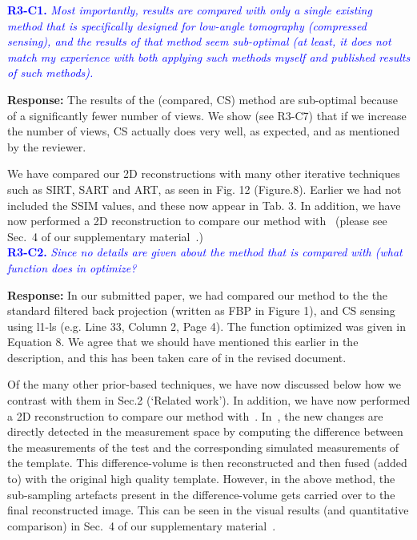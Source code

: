\documentclass{article}
\begin{document}
\textcolor{blue}{\textbf{R3-C1.}\textit{ Most importantly, results are compared with only a single existing method that is specifically designed for low-angle tomography (compressed sensing), and the results of that method seem sub-optimal (at least, it does not match my experience with both applying such methods myself and published results of such methods). }}

\textbf{ Response:} The results of the (compared, CS) method are sub-optimal because of a significantly fewer number of views.  We show  (see R3-C7) that if we increase the number of views, CS actually does very well, as expected, and as mentioned by the reviewer.

We have compared our 2D reconstructions with many other iterative techniques such as SIRT, SART and ART, as seen in Fig. 12 (Figure.8). Earlier we had not included the SSIM values,  and these now appear in Tab. 3.  In addition, we have now performed a 2D reconstruction to compare our method with~\cite{Lee2012} (please see Sec.~4 of our supplementary material~\cite{supp_paper}.)\\

\textcolor{blue}{\textbf{R3-C2.}\textit{ Since no details are given about the method that is compared with (what function does in optimize?}}

\textbf{ Response:} In our submitted paper, we had compared our method to the the standard filtered back projection (written as FBP in Figure 1), and CS sensing using l1-ls (e.g. Line 33, Column 2, Page 4). The function optimized was given in Equation 8. We agree that we should have mentioned this earlier in the description, and this has been taken care of in the revised document. 

Of the many other prior-based techniques, we have now discussed  below how we contrast with them in Sec.2 (`Related work'). In addition, we have now performed a 2D reconstruction to compare our method with~\cite{Lee2012}. In~\cite{Lee2012}, the new changes are directly detected in the measurement space by computing the difference between the measurements of the test and the corresponding simulated measurements of the template. This difference-volume is then reconstructed and then fused (added to) with the original high quality template.
However, in the above method, the sub-sampling artefacts present in the difference-volume gets carried over to the final reconstructed image. This can be seen in the visual results (and quantitative comparison) in Sec.~4 of our supplementary material~\cite{supp_paper}.\\
\end{document}
